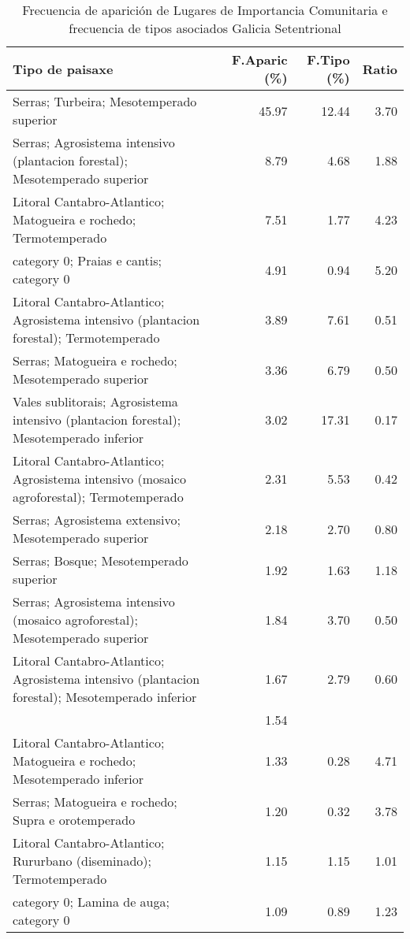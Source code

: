 \begin{table}[p]
\centering
\caption{Frecuencia de aparición de Lugares de Importancia Comunitaria e frecuencia de tipos asociados Galicia Setentrional} 
\label{vnatura10}
\begin{tabular}{lrrr}
  \hline
Tipo de paisaxe & F.Aparic (\%) & F.Tipo (\%) & Ratio \\ 
  \hline
Serras; Turbeira; Mesotemperado superior & 45.97 & 12.44 & 3.70 \\ 
  Serras; Agrosistema intensivo (plantacion forestal); Mesotemperado superior & 8.79 & 4.68 & 1.88 \\ 
  Litoral Cantabro-Atlantico; Matogueira e rochedo; Termotemperado & 7.51 & 1.77 & 4.23 \\ 
  category 0; Praias e cantis; category 0 & 4.91 & 0.94 & 5.20 \\ 
  Litoral Cantabro-Atlantico; Agrosistema intensivo (plantacion forestal); Termotemperado & 3.89 & 7.61 & 0.51 \\ 
  Serras; Matogueira e rochedo; Mesotemperado superior & 3.36 & 6.79 & 0.50 \\ 
  Vales sublitorais; Agrosistema intensivo (plantacion forestal); Mesotemperado inferior & 3.02 & 17.31 & 0.17 \\ 
  Litoral Cantabro-Atlantico; Agrosistema intensivo (mosaico agroforestal); Termotemperado & 2.31 & 5.53 & 0.42 \\ 
  Serras; Agrosistema extensivo; Mesotemperado superior & 2.18 & 2.70 & 0.80 \\ 
  Serras; Bosque; Mesotemperado superior & 1.92 & 1.63 & 1.18 \\ 
  Serras; Agrosistema intensivo (mosaico agroforestal); Mesotemperado superior & 1.84 & 3.70 & 0.50 \\ 
  Litoral Cantabro-Atlantico; Agrosistema intensivo (plantacion forestal); Mesotemperado inferior & 1.67 & 2.79 & 0.60 \\ 
   & 1.54 &  &  \\ 
  Litoral Cantabro-Atlantico; Matogueira e rochedo; Mesotemperado inferior & 1.33 & 0.28 & 4.71 \\ 
  Serras; Matogueira e rochedo; Supra e orotemperado & 1.20 & 0.32 & 3.78 \\ 
  Litoral Cantabro-Atlantico; Rururbano (diseminado); Termotemperado & 1.15 & 1.15 & 1.01 \\ 
  category 0; Lamina de auga; category 0 & 1.09 & 0.89 & 1.23 \\ 
   \hline
\end{tabular}
\end{table}
